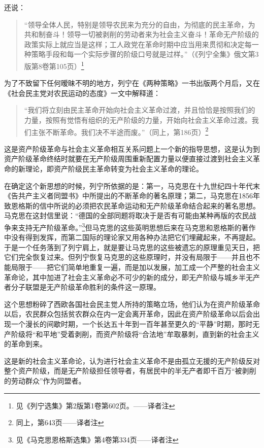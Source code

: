 还说：

\begin{quotation}
“领导全体人民，特别是领导农民来为充分的自由，为彻底的民主革命，为共和制奋斗！领导一切被剥削的劳动者来为社会主义奋斗！革命无产阶级的政策实际上就应当是这样；工人政党在革命时期中应当用来贯彻和决定每一种策略手段和每一个实际步骤的阶级口号就是过样。”（《列宁全集》俄文第3版第8卷第105页）\footnote{见《列宁选集》第2版第1卷第602页。——译者注}
\end{quotation}

为了不致留下任何暧昧不明的地方，列宁在《两种策略》一书出版两个月后，又在《社会民主党对农民运动的态度》一文中解释道：

\begin{quotation}
“我们将立刻由民主革命开始向社会主义革命过渡，并且恰恰是按照我们的力量，按照有觉悟有组织的无产阶级的力量，开始向社会主义革命过渡。我们主张不断革命。我们决不半途而废。”（同上，第186页）\footnote{同上，第643页——译者注}
\end{quotation}

这是资产阶级革命与社会主义革命相互关系问题上一个新的指导思想，这是认为到资产阶级革命终结时就要在无产阶级周围重新配置力量以便直接过渡到社会主义革命的新理论，即资产阶级民主革命转变为社会主义革命的理论。

在确定这个新思想的时候，列宁所依据的是：第一，马克思在十九世纪四十年代末《告共产主义者同盟书》中所提出的不断革命的著名原理；第二，马克思在1856年致恩格斯的信中所说的必须把农民革命运动和无产阶级革命结合起来的著名思想。马克思在这封信里说：“德国的全部同题将取决于是否有可能由某种再版的农民战争来支持无产阶级革命。”\footnote{见《马克思恩格斯选集》第4卷第334页——译者注}但马克思的这些英明思想后来在马克思和恩格斯的著作中没有得到发挥，而第二国际的理论家又用各种办法把它们埋藏起来，不再提起。于是一个任务落到了列宁肩上，就是要让马克思的这些被遗忘的原理重见天日，把它们完全恢复过来。但列宁恢复马克思的这些原理时，并没有局限于——并且也不能局限于——把它们简单地重复一遍，而是加以发展，加工成一个严整的社会主义革命论，其中加进了社会主义革命必不可少的新的成分，即无产阶级与城乡半无产者分子联盟是无产阶级革命胜利的条件这一原理。

这个思想粉碎了西欧各国社会民主觉人所持的策略立场，他们认为在资产阶级革命以后，农民群众包括贫农群众在内一定会离开革命，因此在资产阶级革命以后会出现一个漫长的间歇时期，一个长达五十年到一百年甚至更久的“平静”时期，那时无产阶级将“和平地”受着剥削，而资产阶级将“合法地”牟取暴刺，直到新的社会主义的革命到来。

这是新的社会主义革命论，认为进行社会主义革命不是由孤立无援的无产阶级反对整个资产阶级，而是无产阶级担任领导者，有居民中的半无产者即千百万“被剥削的劳动群众”作为同盟者。

